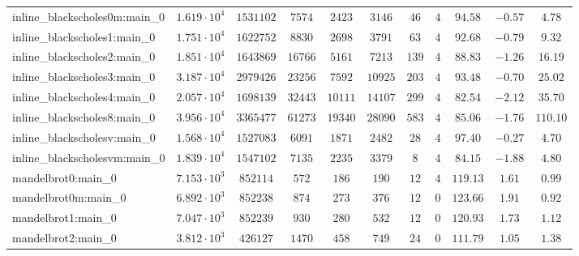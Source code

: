 \begin{tabular}{|l|c|c|c|c|c|c|c|c|c|c|}
inline\_blackscholes0m:main\_0 & $ 1.619 \cdot 10^{4} $ & $ 1531102  $ & $ 7574   $ & $ 2423   $ & $ 3146   $ & $ 46   $ & $ 4    $ & $ 94.58       $ & $ -0.57   $ & $ 4.78    $ \\
inline\_blackscholes1:main\_0  & $ 1.751 \cdot 10^{4} $ & $ 1622752  $ & $ 8830   $ & $ 2698   $ & $ 3791   $ & $ 63   $ & $ 4    $ & $ 92.68       $ & $ -0.79   $ & $ 9.32    $ \\
inline\_blackscholes2:main\_0  & $ 1.851 \cdot 10^{4} $ & $ 1643869  $ & $ 16766  $ & $ 5161   $ & $ 7213   $ & $ 139  $ & $ 4    $ & $ 88.83       $ & $ -1.26   $ & $ 16.19   $ \\
inline\_blackscholes3:main\_0  & $ 3.187 \cdot 10^{4} $ & $ 2979426  $ & $ 23256  $ & $ 7592   $ & $ 10925  $ & $ 203  $ & $ 4    $ & $ 93.48       $ & $ -0.70   $ & $ 25.02   $ \\
inline\_blackscholes4:main\_0  & $ 2.057 \cdot 10^{4} $ & $ 1698139  $ & $ 32443  $ & $ 10111  $ & $ 14107  $ & $ 299  $ & $ 4    $ & $ 82.54       $ & $ -2.12   $ & $ 35.70   $ \\
inline\_blackscholes8:main\_0  & $ 3.956 \cdot 10^{4} $ & $ 3365477  $ & $ 61273  $ & $ 19340  $ & $ 28090  $ & $ 583  $ & $ 4    $ & $ 85.06       $ & $ -1.76   $ & $ 110.10  $ \\
inline\_blackscholesv:main\_0  & $ 1.568 \cdot 10^{4} $ & $ 1527083  $ & $ 6091   $ & $ 1871   $ & $ 2482   $ & $ 28   $ & $ 4    $ & $ 97.40       $ & $ -0.27   $ & $ 4.70    $ \\
inline\_blackscholesvm:main\_0 & $ 1.839 \cdot 10^{4} $ & $ 1547102  $ & $ 7135   $ & $ 2235   $ & $ 3379   $ & $ 8    $ & $ 4    $ & $ 84.15       $ & $ -1.88   $ & $ 4.80    $ \\
mandelbrot0:main\_0            & $ 7.153 \cdot 10^{3} $ & $ 852114   $ & $ 572    $ & $ 186    $ & $ 190    $ & $ 12   $ & $ 4    $ & $ 119.13      $ & $ 1.61    $ & $ 0.99    $ \\
mandelbrot0m:main\_0           & $ 6.892 \cdot 10^{3} $ & $ 852238   $ & $ 874    $ & $ 273    $ & $ 376    $ & $ 12   $ & $ 0    $ & $ 123.66      $ & $ 1.91    $ & $ 0.92    $ \\
mandelbrot1:main\_0            & $ 7.047 \cdot 10^{3} $ & $ 852239   $ & $ 930    $ & $ 280    $ & $ 532    $ & $ 12   $ & $ 0    $ & $ 120.93      $ & $ 1.73    $ & $ 1.12    $ \\
mandelbrot2:main\_0            & $ 3.812 \cdot 10^{3} $ & $ 426127   $ & $ 1470   $ & $ 458    $ & $ 749    $ & $ 24   $ & $ 0    $ & $ 111.79      $ & $ 1.05    $ & $ 1.38    $ \\

\end{tabular}
